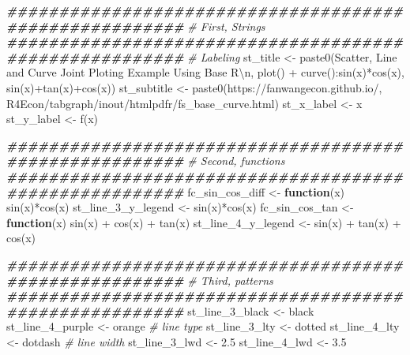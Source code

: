 \documentclass[
]{book}
\newenvironment{Shaded}{\begin{snugshade}}{\end{snugshade}}
\newcommand{\CommentTok}[1]{\textcolor[rgb]{0.56,0.35,0.01}{\textit{#1}}}
\newcommand{\ControlFlowTok}[1]{\textcolor[rgb]{0.13,0.29,0.53}{\textbf{#1}}}
\newcommand{\DocumentationTok}[1]{\textcolor[rgb]{0.56,0.35,0.01}{\textbf{\textit{#1}}}}
\newcommand{\FloatTok}[1]{\textcolor[rgb]{0.00,0.00,0.81}{#1}}
\newcommand{\FunctionTok}[1]{\textcolor[rgb]{0.00,0.00,0.00}{#1}}
\newcommand{\NormalTok}[1]{#1}
\newcommand{\OtherTok}[1]{\textcolor[rgb]{0.56,0.35,0.01}{#1}}
\newcommand{\SpecialCharTok}[1]{\textcolor[rgb]{0.00,0.00,0.00}{#1}}
\newcommand{\StringTok}[1]{\textcolor[rgb]{0.31,0.60,0.02}{#1}}
\begin{document}
\begin{Shaded}
\begin{Highlighting}[]
\DocumentationTok{\#\#\#\#\#\#\#\#\#\#\#\#\#\#\#\#\#\#\#\#\#\#\#\#\#\#\#\#\#\#\#\#\#\#\#\#\#\#\#\#\#\#\#\#\#\#\#\#\#\#\#\#\#\#\#}
\CommentTok{\# First, Strings}
\DocumentationTok{\#\#\#\#\#\#\#\#\#\#\#\#\#\#\#\#\#\#\#\#\#\#\#\#\#\#\#\#\#\#\#\#\#\#\#\#\#\#\#\#\#\#\#\#\#\#\#\#\#\#\#\#\#\#\#}
\CommentTok{\# Labeling}
\NormalTok{st\_title }\OtherTok{\textless{}{-}} \FunctionTok{paste0}\NormalTok{(}\StringTok{\textquotesingle{}Scatter, Line and Curve Joint Ploting Example Using Base R}\SpecialCharTok{\textbackslash{}n}\StringTok{\textquotesingle{}}\NormalTok{,}
                   \StringTok{\textquotesingle{}plot() + curve():sin(x)*cos(x), sin(x)+tan(x)+cos(x)\textquotesingle{}}\NormalTok{)}
\NormalTok{st\_subtitle }\OtherTok{\textless{}{-}} \FunctionTok{paste0}\NormalTok{(}\StringTok{\textquotesingle{}https://fanwangecon.github.io/\textquotesingle{}}\NormalTok{,}
                      \StringTok{\textquotesingle{}R4Econ/tabgraph/inout/htmlpdfr/fs\_base\_curve.html\textquotesingle{}}\NormalTok{)}
\NormalTok{st\_x\_label }\OtherTok{\textless{}{-}} \StringTok{\textquotesingle{}x\textquotesingle{}}
\NormalTok{st\_y\_label }\OtherTok{\textless{}{-}} \StringTok{\textquotesingle{}f(x)\textquotesingle{}}

\DocumentationTok{\#\#\#\#\#\#\#\#\#\#\#\#\#\#\#\#\#\#\#\#\#\#\#\#\#\#\#\#\#\#\#\#\#\#\#\#\#\#\#\#\#\#\#\#\#\#\#\#\#\#\#\#\#\#\#}
\CommentTok{\# Second, functions}
\DocumentationTok{\#\#\#\#\#\#\#\#\#\#\#\#\#\#\#\#\#\#\#\#\#\#\#\#\#\#\#\#\#\#\#\#\#\#\#\#\#\#\#\#\#\#\#\#\#\#\#\#\#\#\#\#\#\#\#}
\NormalTok{fc\_sin\_cos\_diff }\OtherTok{\textless{}{-}} \ControlFlowTok{function}\NormalTok{(x) }\FunctionTok{sin}\NormalTok{(x)}\SpecialCharTok{*}\FunctionTok{cos}\NormalTok{(x)}
\NormalTok{st\_line\_3\_y\_legend }\OtherTok{\textless{}{-}} \StringTok{\textquotesingle{}sin(x)*cos(x)\textquotesingle{}}
\NormalTok{fc\_sin\_cos\_tan }\OtherTok{\textless{}{-}} \ControlFlowTok{function}\NormalTok{(x) }\FunctionTok{sin}\NormalTok{(x) }\SpecialCharTok{+} \FunctionTok{cos}\NormalTok{(x) }\SpecialCharTok{+} \FunctionTok{tan}\NormalTok{(x)}
\NormalTok{st\_line\_4\_y\_legend }\OtherTok{\textless{}{-}} \StringTok{\textquotesingle{}sin(x) + tan(x) + cos(x)\textquotesingle{}}

\DocumentationTok{\#\#\#\#\#\#\#\#\#\#\#\#\#\#\#\#\#\#\#\#\#\#\#\#\#\#\#\#\#\#\#\#\#\#\#\#\#\#\#\#\#\#\#\#\#\#\#\#\#\#\#\#\#\#\#}
\CommentTok{\# Third, patterns}
\DocumentationTok{\#\#\#\#\#\#\#\#\#\#\#\#\#\#\#\#\#\#\#\#\#\#\#\#\#\#\#\#\#\#\#\#\#\#\#\#\#\#\#\#\#\#\#\#\#\#\#\#\#\#\#\#\#\#\#}
\NormalTok{st\_line\_3\_black }\OtherTok{\textless{}{-}} \StringTok{\textquotesingle{}black\textquotesingle{}}
\NormalTok{st\_line\_4\_purple }\OtherTok{\textless{}{-}} \StringTok{\textquotesingle{}orange\textquotesingle{}}
\CommentTok{\# line type}
\NormalTok{st\_line\_3\_lty }\OtherTok{\textless{}{-}} \StringTok{\textquotesingle{}dotted\textquotesingle{}}
\NormalTok{st\_line\_4\_lty }\OtherTok{\textless{}{-}} \StringTok{\textquotesingle{}dotdash\textquotesingle{}}
\CommentTok{\# line width}
\NormalTok{st\_line\_3\_lwd }\OtherTok{\textless{}{-}} \FloatTok{2.5}
\NormalTok{st\_line\_4\_lwd }\OtherTok{\textless{}{-}} \FloatTok{3.5}


\end{Highlighting}
\end{Shaded}
\end{document}
